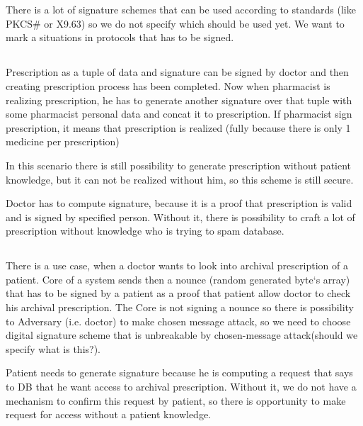 \chapter {}
There is a lot of signature schemes that can be used according to standards (like PKCS\# or X9.63) so we do not specify which should be used yet. We want to mark a situations in protocols that has to be signed.
\section{
}
Prescription as a tuple of data and signature can be signed by doctor and then creating prescription process has been completed. Now when pharmacist is realizing prescription, he has to generate another signature over that tuple with some pharmacist personal data and concat it to prescription. If pharmacist sign prescription, it means that prescription is realized (fully because there is only 1 medicine per prescription)

In this scenario there is still possibility to generate prescription without patient knowledge, but it can not be realized without him, so this scheme is still secure. 

Doctor has to compute signature, because it is a proof that prescription is valid and is signed by specified person. Without it, there is possibility to craft a lot of prescription without knowledge who is trying to spam database.

\section {}

There is a use case, when a doctor wants to look into archival prescription of a patient. Core of a system sends then a nounce (random generated byte`s array) that has to be signed by a patient as a proof that patient allow doctor to check his archival prescription. The Core is not signing a nounce so there is possibility to Adversary (i.e. doctor) to make chosen message attack, so we need to choose digital signature scheme that is unbreakable by chosen-message attack(should we specify what is this?). 

Patient needs to generate signature because he is computing a request that says to DB that he want access to archival prescription. Without it, we do not have a mechanism to confirm this request by patient, so there is opportunity to make request for access without a patient knowledge.


